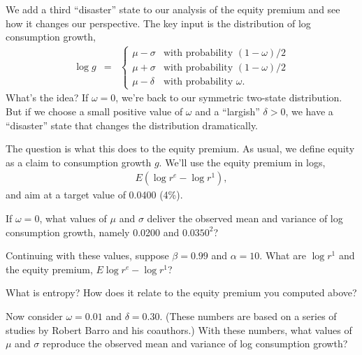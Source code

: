 \documentclass[11pt]{exam}
\begin{document}
\begin{questions}
We add a third ``disaster'' state to our analysis of the equity premium
and see how it changes our perspective.
The key input is the distribution of log consumption growth,
\begin{eqnarray*}
    \log g &=& \left\{
                \begin{array}{ll}
                \mu - \sigma & \mbox{with probability } (1-\omega)/2 \\
                \mu + \sigma & \mbox{with probability } (1-\omega)/2 \\
                \mu - \delta & \mbox{with probability } \omega .
                \end{array}
                \right.
\end{eqnarray*}
What's the idea?
If $\omega = 0$, we're back to our symmetric two-state distribution.
But if we choose a small positive value of $\omega$ and a ``largish'' $\delta>0$,
we have a ``disaster'' state that changes the distribution dramatically.

The question is what this does to the equity premium.
As usual, we define equity as a claim to consumption growth $g$.
We'll use the equity premium in logs,
\begin{eqnarray*}
    E ( \log r^e - \log r^1 ) ,
\end{eqnarray*}
and aim at a target value of 0.0400 (4\%).


\begin{parts}
\item If $\omega = 0$, what values of $\mu$ and $\sigma$ deliver
the observed mean and variance of log consumption growth, namely
0.0200 and $0.0350^2$?

\item Continuing with these values, suppose $\beta = 0.99$ and $\alpha = 10$.
What are $\log r^1$ and
the equity premium,  $E \log r^e - \log r^1 $?

\item What is entropy?
How does it relate to the equity premium you computed above?

\item Now consider $\omega = 0.01$ and $\delta = 0.30$.
(These numbers are based on a series of studies by Robert Barro and his coauthors.)
With these numbers, what values of $\mu$ and $\sigma$ reproduce
the observed mean and variance of log consumption growth?


\end{parts}
\end{questions}
\end{document}
